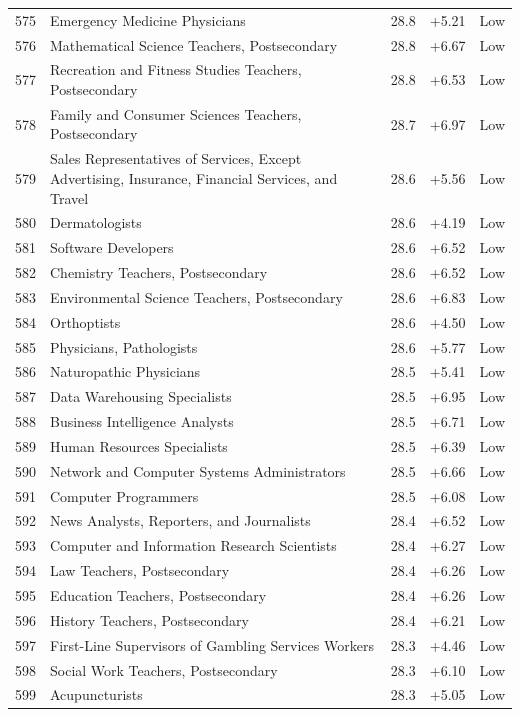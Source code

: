 {\begin{longtable}{rp{7cm}ccc}
575 & Emergency Medicine Physicians & 28.8 & +5.21 & Low \\
576 & Mathematical Science Teachers, Postsecondary & 28.8 & +6.67 & Low \\
577 & Recreation and Fitness Studies Teachers, Postsecondary & 28.8 & +6.53 & Low \\
578 & Family and Consumer Sciences Teachers, Postsecondary & 28.7 & +6.97 & Low \\
579 & Sales Representatives of Services, Except Advertising, Insurance, Financial Services, and Travel & 28.6 & +5.56 & Low \\
580 & Dermatologists & 28.6 & +4.19 & Low \\
581 & Software Developers & 28.6 & +6.52 & Low \\
582 & Chemistry Teachers, Postsecondary & 28.6 & +6.52 & Low \\
583 & Environmental Science Teachers, Postsecondary & 28.6 & +6.83 & Low \\
584 & Orthoptists & 28.6 & +4.50 & Low \\
585 & Physicians, Pathologists & 28.6 & +5.77 & Low \\
586 & Naturopathic Physicians & 28.5 & +5.41 & Low \\
587 & Data Warehousing Specialists & 28.5 & +6.95 & Low \\
588 & Business Intelligence Analysts & 28.5 & +6.71 & Low \\
589 & Human Resources Specialists & 28.5 & +6.39 & Low \\
590 & Network and Computer Systems Administrators & 28.5 & +6.66 & Low \\
591 & Computer Programmers & 28.5 & +6.08 & Low \\
592 & News Analysts, Reporters, and Journalists & 28.4 & +6.52 & Low \\
593 & Computer and Information Research Scientists & 28.4 & +6.27 & Low \\
594 & Law Teachers, Postsecondary & 28.4 & +6.26 & Low \\
595 & Education Teachers, Postsecondary & 28.4 & +6.26 & Low \\
596 & History Teachers, Postsecondary & 28.4 & +6.21 & Low \\
597 & First-Line Supervisors of Gambling Services Workers & 28.3 & +4.46 & Low \\
598 & Social Work Teachers, Postsecondary & 28.3 & +6.10 & Low \\
599 & Acupuncturists & 28.3 & +5.05 & Low \\

\end{longtable}}
